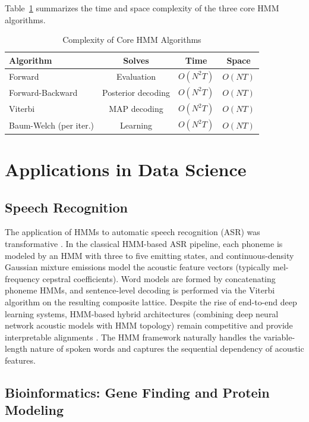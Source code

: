 \documentclass[conference]{IEEEtran}
\begin{document}
Table~\ref{tab:complexity} summarizes the time and space complexity of the three core HMM algorithms.

\begin{table}[h]
\centering
\caption{Complexity of Core HMM Algorithms}
\label{tab:complexity}
\begin{tabular}{lccc}
\toprule
\textbf{Algorithm} & \textbf{Solves} & \textbf{Time} & \textbf{Space} \\
\midrule
Forward & Evaluation & $O(N^2 T)$ & $O(NT)$ \\
Forward-Backward & Posterior decoding & $O(N^2 T)$ & $O(NT)$ \\
Viterbi & MAP decoding & $O(N^2 T)$ & $O(NT)$ \\
Baum-Welch (per iter.) & Learning & $O(N^2 T)$ & $O(NT)$ \\
\bottomrule
\end{tabular}
\end{table}

\section{Applications in Data Science}
\label{sec:applications}

\subsection{Speech Recognition}

The application of HMMs to automatic speech recognition (ASR) was transformative \cite{rabiner1989tutorial, jelinek1976continuous}. In the classical HMM-based ASR pipeline, each phoneme is modeled by an HMM with three to five emitting states, and continuous-density Gaussian mixture emissions model the acoustic feature vectors (typically mel-frequency cepstral coefficients). Word models are formed by concatenating phoneme HMMs, and sentence-level decoding is performed via the Viterbi algorithm on the resulting composite lattice. Despite the rise of end-to-end deep learning systems, HMM-based hybrid architectures (combining deep neural network acoustic models with HMM topology) remain competitive and provide interpretable alignments \cite{graves2006connectionist}. The HMM framework naturally handles the variable-length nature of spoken words and captures the sequential dependency of acoustic features.

\subsection{Bioinformatics: Gene Finding and Protein Modeling}
\end{document}
